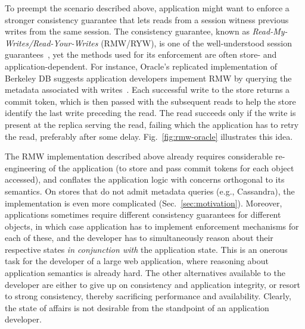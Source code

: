 To preempt the scenario described above, application might want to
enforce a stronger consistency guarantee that lets reads from a
session witness previous writes from the same session. The consistency
guarantee, known as \emph{Read-My-Writes/Read-Your-Writes} (RMW/RYW),
is one of the well-understood session guarantees~\cite{terry-pdis94},
yet the methods used for its enforcement are often store- and
application-dependent. For instance, Oracle's replicated
implementation of Berkeley DB suggests application developers impement
RMW by querying the metadata associated with writes~\cite{oracle-ryw}.
Each successful write to the store returns a commit token, which is
then passed with the subsequent reads to help the store identify the
last write preceding the read. The read succeeds only if the write is
present at the replica serving the read, failing which the application
has to retry the read, preferably after some delay.
Fig.~\ref{fig:rmw-oracle} illustrates this idea.

The RMW implementation described above already requires considerable
re-engineering of the application (to store and pass commit tokens for
each object accessed), and conflates the application logic with
concerns orthogonal to its semantics. On stores that do not admit
metadata queries (e.g., Cassandra), the implementation is even more
complicated (Sec.~\ref{sec:motivation}). Moreover, applications
sometimes require different consistency guarantees for different
objects, in which case application has to implement enforcement
mechanisms for each of these, and the developer has to simultaneously
reason about their respective states \emph{in conjunction with} the
application state. This is an onerous task for the developer of a
large web application, where reasoning about application semantics is
already hard. The other alternatives available to the developer are
either to give up on consistency and application integrity, or resort
to strong consistency, thereby sacrificing performance and
availability. Clearly, the state of affairs is not desirable from the
standpoint of an application developer.

